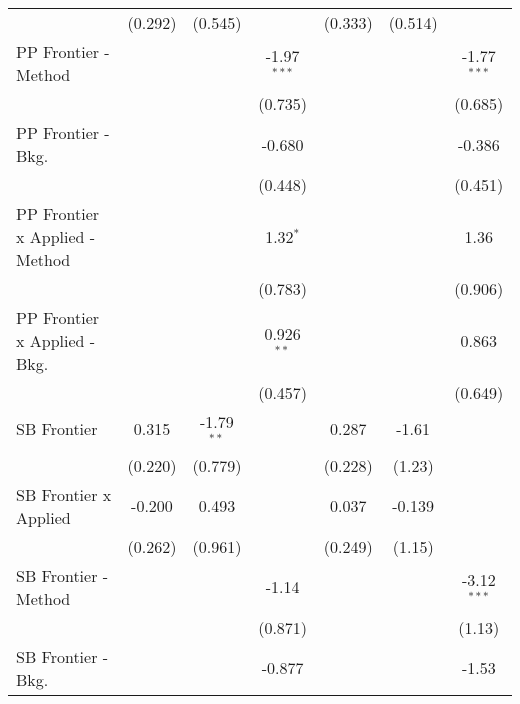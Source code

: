 \begin{tabular}{lcccccc}
                                  & (0.292)       & (0.545)       &               & (0.333)       & (0.514)       &   \\   
   PP Frontier - Method           &               &               & -1.97$^{***}$ &               &               & -1.77$^{***}$\\   
                                  &               &               & (0.735)       &               &               & (0.685)\\   
   PP Frontier - Bkg.             &               &               & -0.680        &               &               & -0.386\\   
                                  &               &               & (0.448)       &               &               & (0.451)\\   
   PP Frontier x Applied - Method &               &               & 1.32$^{*}$    &               &               & 1.36\\   
                                  &               &               & (0.783)       &               &               & (0.906)\\   
   PP Frontier x Applied - Bkg.   &               &               & 0.926$^{**}$  &               &               & 0.863\\   
                                  &               &               & (0.457)       &               &               & (0.649)\\   
   SB Frontier                    & 0.315         & -1.79$^{**}$  &               & 0.287         & -1.61         &   \\   
                                  & (0.220)       & (0.779)       &               & (0.228)       & (1.23)        &   \\   
   SB Frontier x Applied          & -0.200        & 0.493         &               & 0.037         & -0.139        &   \\   
                                  & (0.262)       & (0.961)       &               & (0.249)       & (1.15)        &   \\   
   SB Frontier - Method           &               &               & -1.14         &               &               & -3.12$^{***}$\\   
                                  &               &               & (0.871)       &               &               & (1.13)\\   
   SB Frontier - Bkg.             &               &               & -0.877        &               &               & -1.53\\   

\end{tabular}
